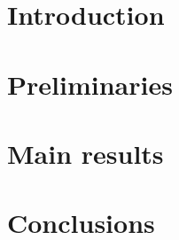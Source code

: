\documentclass[a4paper,UKenglish]{lipics-v2021}
\begin{document}
	
	\maketitle
	
	
	
	\section{Introduction}\label{sec:introduction}
	
	
	
	\section{Preliminaries}\label{sec:preliminaries}
	
	
	
	\section{Main results}\label{sec:results}
	
	
	
	\section{Conclusions}\label{sec:conclusions}
	
	
	
	\newpage
	
	
	
	\newpage
	\appendix
	
	
\end{document}
